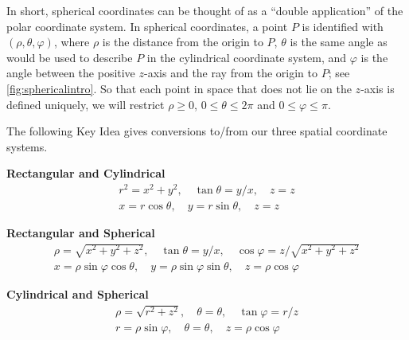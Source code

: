 
In short, spherical coordinates can be thought of as a ``double application'' of the polar coordinate system. In spherical coordinates, a point $P$ is identified with $(\rho,\theta,\varphi)$, where $\rho$ is the distance from the origin to $P$, $\theta$ is the same angle as would be used to describe $P$ in the cylindrical coordinate system, and $\varphi$ is the angle between the positive $z$-axis and the ray from the origin to $P$; see \autoref{fig:sphericalintro}. So that each point in space that does not lie on the $z$-axis is defined uniquely, we will restrict $\rho \geq 0$, $0 \leq \theta \leq 2\pi$ and $0 \leq \varphi \leq \pi$.


The following Key Idea gives conversions to/from our three spatial coordinate systems.

{\textbf{Rectangular and Cylindrical}
\begin{gather*}
r^2 = x^2+y^2,\quad \tan \theta = y/x,\quad z=z\\
x=r\cos \theta, \quad y=r\sin\theta,\quad z=z
\end{gather*}

\textbf{Rectangular and Spherical}
\begin{gather*}
\rho = \sqrt{x^2+y^2+z^2},\quad \tan \theta = y/x,\quad \cos \varphi = z/\sqrt{x^2+y^2+z^2}\\
x=\rho\sin\varphi\cos\theta,\quad y=\rho\sin\varphi\sin\theta,\quad z=\rho\cos\varphi
\end{gather*}

\textbf{Cylindrical and Spherical }
\begin{gather*}
\rho=\sqrt{r^2+z^2}, \quad \theta = \theta,\quad \tan \varphi = r/z \\
r=\rho \sin \varphi, \quad \theta = \theta, \quad z=\rho\cos\varphi
\end{gather*}}

